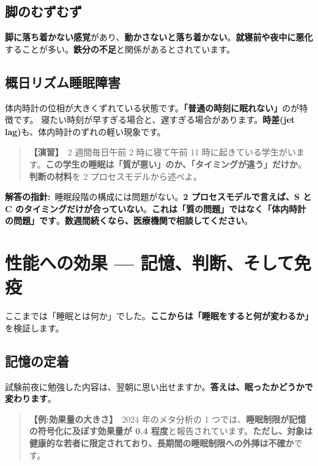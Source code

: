 \documentclass{article}
\begin{document}
\subsection{脚のむずむず}

\textbf{脚に落ち着かない感覚}があり、\textbf{動かさないと落ち着かない}。\textbf{就寝前や夜中に悪化}することが多い。\textbf{鉄分の不足}と関係があるとされています。

\subsection{概日リズム睡眠障害}

体内時計の位相が大きくずれている状態です。\textbf{「普通の時刻に眠れない」}のが特徴です。
寝たい時刻が早すぎる場合と、遅すぎる場合があります。\textbf{時差(jet lag)}も、体内時計のずれの軽い現象です。

\begin{quote}
\textbf{【演習】}\ 2 週間毎日午前 2 時に寝て午前 11 時に起きている学生がいます。\textbf{この学生の睡眠は「質が悪い」のか、「タイミングが違う」だけか}。\textbf{判断の材料}を 2 プロセスモデルから述べよ。
\end{quote}

\textbf{解答の指針:}\ 睡眠段階の構成には問題がない。\textbf{2 プロセスモデルで言えば、S と C のタイミングだけが合っていない}。\textbf{これは「質の問題」ではなく「体内時計の問題」です}。\textbf{数週間続くなら、医療機関で相談してください}。

\section{性能への効果 — 記憶、判断、そして免疫}

ここまでは「睡眠とは何か」でした。\textbf{ここからは「睡眠をすると何が変わるか」}を検証します。

\subsection{記憶の定着}

試験前夜に勉強した内容は、翌朝に思い出せますか。\textbf{答えは、眠ったかどうかで変わります}。

\begin{quote}
\textbf{【例:効果量の大きさ】}\ 2024 年のメタ分析の 1 つでは、\textbf{睡眠制限が記憶の符号化に及ぼす効果量が 0.4 程度}と報告されています。\textbf{ただし、対象は健康的な若者に限定されており、長期間の睡眠制限への外挿は不確か}です。
\end{quote}
\end{document}
